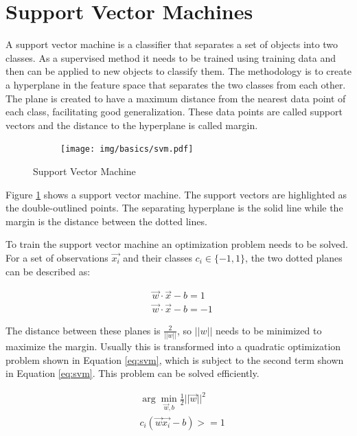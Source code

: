\documentclass[pdftex,12pt,a4paper]{report}
\begin{document}
\section{Support Vector Machines}

A support vector machine is a classifier that separates a set of objects into two classes. As a supervised method it needs to be trained using training data and then can be applied to new objects to classify them. The methodology is to create a hyperplane in the feature space that separates the two classes from each other. The plane is created to have a maximum distance from the nearest data point of each class, facilitating good generalization. These data points are called support vectors and the distance to the hyperplane is called margin.

\begin{figure}[h]
	\centering
	\begin{subfigure}[b]{0.75\textwidth}
		\centering
		\texttt{[image: img/basics/svm.pdf]}
	\end{subfigure}
	\caption{Support Vector Machine}
	\label{fig:basics-svm}
\end{figure}

Figure \ref{fig:basics-svm} shows a support vector machine. The support vectors are highlighted as the double-outlined points. The separating hyperplane is the solid line while the margin is the distance between the dotted lines.

To train the support vector machine an optimization problem needs to be solved. For a set of observations $\vec{x_i}$ and their classes $c_i \in \{ -1, 1 \}$, the two dotted planes can be described as:

\begin{equation}
\begin{split}
	& \vec{w} \cdot \vec{x} - b = 1 \\
	& \vec{w} \cdot \vec{x} - b = -1
\end{split}
\end{equation}

The distance between these planes is $\frac{2}{||w||}$, so $||w||$ needs to be minimized to maximize the margin. Usually this is transformed into a quadratic optimization problem shown in Equation \ref{eq:svm}, which is subject to the second term shown in Equation \ref{eq:svm}. This problem can be solved efficiently.

\begin{equation}
\label{eq:svm}
\begin{split}
& \arg\min_{\vec{w}, b} \frac{1}{2} ||\vec{w}||^2 \\
& c_i (\vec{w} \vec{x_i} - b) >= 1
\end{split}
\end{equation}
\end{document}
